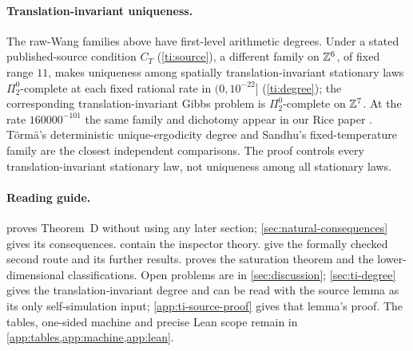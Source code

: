 \paragraph{Translation-invariant uniqueness.}
The raw-Wang families above have first-level arithmetic degrees. Under a stated published-source condition $C_T$ (\cref{ti:source}), a different family on $\mathbb{Z}^6$, of fixed range $11$, makes uniqueness among spatially translation-invariant stationary laws $\Pi^0_2$-complete at each fixed rational rate in $(0,10^{-22}]$ (\cref{ti:degree}); the corresponding translation-invariant Gibbs problem is $\Pi^0_2$-complete on $\mathbb{Z}^7$. At the rate $160000^{-101}$ the same family and dichotomy appear in our Rice paper \cite[Lemma~6.1 and Theorem~C]{DMrice}. T\"orm\"a's deterministic unique-ergodicity degree \cite[Proposition~48]{Torma15} and Sandhu's fixed-temperature family \cite{Sandhu26} are the closest independent comparisons. The proof controls every translation-invariant stationary law, not uniqueness among all stationary laws.

\paragraph{Reading guide.}
 proves Theorem~D without using any later section; \cref{sec:natural-consequences} gives its consequences.  contain the inspector theory.  give the formally checked second route and its further results.  proves the saturation theorem and the lower-dimensional classifications. Open problems are in \cref{sec:discussion}; \cref{sec:ti-degree} gives the translation-invariant degree and can be read with the source lemma as its only self-simulation input; \cref{app:ti-source-proof} gives that lemma's proof. The tables, one-sided machine and precise Lean scope remain in \cref{app:tables,app:machine,app:lean}.



